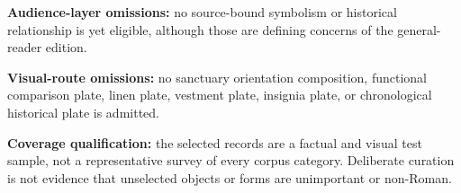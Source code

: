 \item \textbf{Audience-layer omissions:} no source-bound symbolism or
  historical relationship is yet eligible, although those are defining
  concerns of the general-reader edition.
\item \textbf{Visual-route omissions:} no sanctuary orientation composition,
  functional comparison plate, linen plate, vestment plate, insignia plate,
  or chronological historical plate is admitted.
\item \textbf{Coverage qualification:} the selected records are a factual and
  visual test sample, not a representative survey of every corpus category.
  Deliberate curation is not evidence that unselected objects or forms are
  unimportant or non-Roman.
